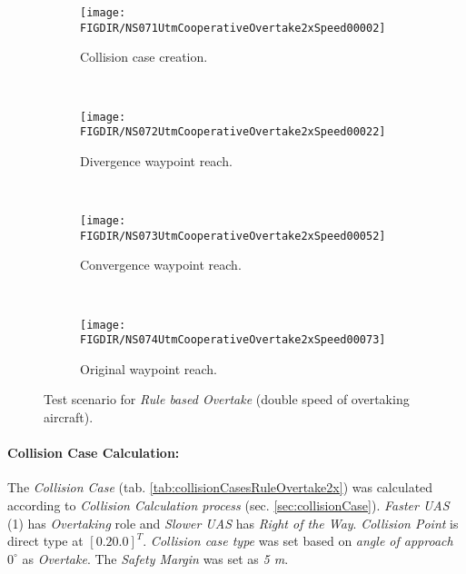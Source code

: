     \begin{figure}[H]
        \centering
        \begin{subfigure}{0.75\textwidth}
            \centering
            \texttt{[image: \\FIGDIR/NS071UtmCooperativeOvertake2xSpeed00002]}
            \caption{Collision case creation.}
            \label{fig:ruleBasedOvertake2xCollisionCaseCreation}
        \end{subfigure}
        \\
        \begin{subfigure}{0.75\textwidth}
            \centering
            \texttt{[image: \\FIGDIR/NS072UtmCooperativeOvertake2xSpeed00022]} 
            \caption{Divergence waypoint reach.}
            \label{fig:ruleBasedOvertake2xDivergenceWaypointReach}
        \end{subfigure}
        \\
        \begin{subfigure}{0.75\textwidth}
            \centering
            \texttt{[image: \\FIGDIR/NS073UtmCooperativeOvertake2xSpeed00052]} 
            \caption{Convergence waypoint reach.}
            \label{fig:ruleBasedOvertake2xConvergenceWaypointReach}
        \end{subfigure}
        \\
        \begin{subfigure}{0.75\textwidth}
            \centering
            \texttt{[image: \\FIGDIR/NS074UtmCooperativeOvertake2xSpeed00073]} 
            \caption{Original waypoint reach.}
            \label{fig:ruleBasedOvertake2xOriginalWaypointReach}
        \end{subfigure}
        \caption{Test scenario for \emph{Rule based Overtake} (double speed of overtaking aircraft). }
        \label{fig:testCaseRuleBasedOvertake2xSpeed}
    \end{figure}
    

    \paragraph{Collision Case Calculation:} The \emph{Collision Case} (tab. \ref{tab:collisionCasesRuleOvertake2x}) was calculated according to \emph{Collision Calculation process} (sec. \ref{sec:collisionCase}). \emph{Faster UAS} (1) has \emph{Overtaking} role and \emph{Slower UAS} has \emph{Right of the Way}. \emph{Collision Point} is direct type at $[0.20.0]^T$. \emph{Collision case type} was set based on \emph{angle of approach} $0^{\circ}$ as \emph{Overtake}. The \emph{Safety Margin} was set as \emph{5 m}.
    
